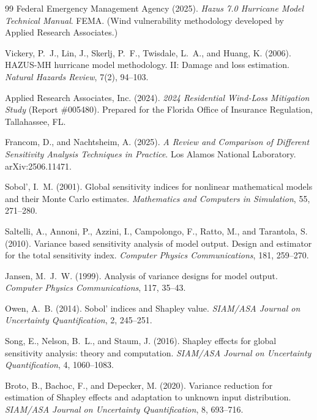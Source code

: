 \documentclass[11pt]{article}
\begin{document}
\begin{thebibliography}{99}
 Federal Emergency Management Agency (2025). \emph{Hazus 7.0
Hurricane Model Technical Manual}. FEMA. (Wind vulnerability methodology developed
by Applied Research Associates.)

 Vickery, P.~J., Lin, J., Skerlj, P.~F., Twisdale, L.~A.,
and Huang, K. (2006). HAZUS-MH hurricane model methodology. II: Damage and loss
estimation. \emph{Natural Hazards Review}, 7(2), 94--103.

 Applied Research Associates, Inc. (2024). \emph{2024
Residential Wind-Loss Mitigation Study} (Report \#005480). Prepared for the
Florida Office of Insurance Regulation, Tallahassee, FL.

 Francom, D., and Nachtsheim, A. (2025). \emph{A Review and
Comparison of Different Sensitivity Analysis Techniques in Practice}. Los Alamos
National Laboratory. arXiv:2506.11471.

 Sobol', I.~M. (2001). Global sensitivity indices for nonlinear
mathematical models and their Monte Carlo estimates. \emph{Mathematics and
Computers in Simulation}, 55, 271--280.

 Saltelli, A., Annoni, P., Azzini, I., Campolongo, F.,
Ratto, M., and Tarantola, S. (2010). Variance based sensitivity analysis of model
output. Design and estimator for the total sensitivity index. \emph{Computer
Physics Communications}, 181, 259--270.

 Jansen, M.~J.~W. (1999). Analysis of variance designs for
model output. \emph{Computer Physics Communications}, 117, 35--43.

 Owen, A.~B. (2014). Sobol' indices and Shapley value.
\emph{SIAM/ASA Journal on Uncertainty Quantification}, 2, 245--251.

 Song, E., Nelson, B.~L., and Staum, J. (2016). Shapley effects
for global sensitivity analysis: theory and computation. \emph{SIAM/ASA Journal on
Uncertainty Quantification}, 4, 1060--1083.

 Broto, B., Bachoc, F., and Depecker, M. (2020). Variance
reduction for estimation of Shapley effects and adaptation to unknown input
distribution. \emph{SIAM/ASA Journal on Uncertainty Quantification}, 8, 693--716.
\end{thebibliography}
\end{document}

